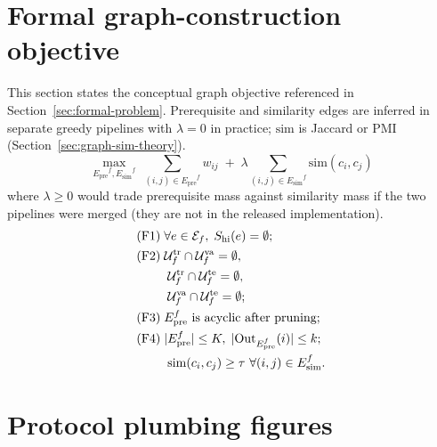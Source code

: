 \documentclass[preprint,11pt]{elsarticle}
\newcommand{\Epre}{\ensuremath{E_{\text{pre}}}}
\newcommand{\Esim}{\ensuremath{E_{\text{sim}}}}
\begin{document}
\section{Formal graph-construction objective}
\label{sec:supp-graph-objective}
\noindent This section states the conceptual graph objective referenced in
Section~\ref{sec:formal-problem}. Prerequisite and similarity edges are inferred
in separate greedy pipelines with $\lambda{=}0$ in practice; $\mathrm{sim}$ is
Jaccard or PMI (Section~\ref{sec:graph-sim-theory}).
\begin{equation}
\max_{\Epre^f,\Esim^f}\;
\sum_{(i,j)\in\Epre^f} w_{ij}
\;+\;
\lambda \sum_{(i,j)\in\Esim^f} \mathrm{sim}(c_i,c_j)
\label{eq:graph-objective}
\end{equation}
where $\lambda\ge 0$ would trade prerequisite mass against similarity mass if the
two pipelines were merged (they are not in the released implementation).
\begin{align}
\text{(F1)} \;& \forall e\in\mathcal{E}_f,\;
  S_{\mathrm{hi}}(e)=\emptyset;
  \label{eq:c1}\\
\text{(F2)} \;& \mathcal{U}^{\mathrm{tr}}_f \cap \mathcal{U}^{\mathrm{va}}_f
  = \emptyset,\notag\\
&\; \mathcal{U}^{\mathrm{tr}}_f \cap \mathcal{U}^{\mathrm{te}}_f
  = \emptyset,\notag\\
&\; \mathcal{U}^{\mathrm{va}}_f \cap \mathcal{U}^{\mathrm{te}}_f
  = \emptyset;
  \label{eq:c2}\\
\text{(F3)} \;& \Epre^f \text{ is acyclic after pruning};
  \label{eq:c3}\\
\text{(F4)} \;& |\Epre^f|\le K,\;
  |\mathrm{Out}_{\Epre^f}(i)|\le k;\notag\\
&\; \mathrm{sim}(c_i,c_j)\ge\tau \ \forall (i,j)\in\Esim^f.
  \label{eq:c4}
\end{align}

\section{Protocol plumbing figures}
\label{sec:supp-protocol-figures}
\end{document}
